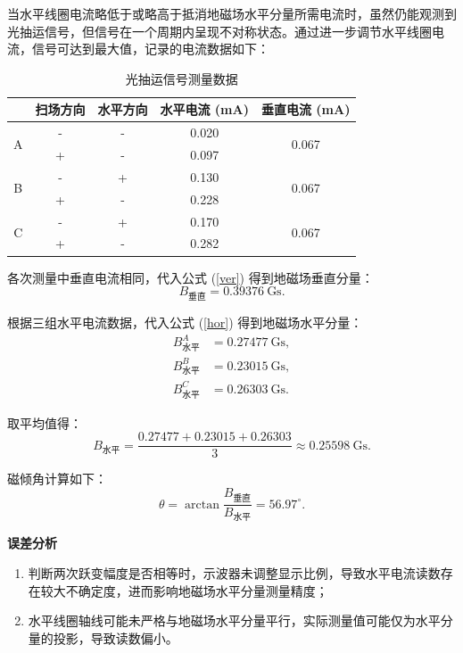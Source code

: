 \documentclass[a4paper, 1.5lines]{ctexart}
\begin{document}
当水平线圈电流略低于或略高于抵消地磁场水平分量所需电流时，虽然仍能观测到光抽运信号，但信号在一个周期内呈现不对称状态。通过进一步调节水平线圈电流，信号可达到最大值，记录的电流数据如下：

\begin{table}[h!]
    \centering
    \caption{光抽运信号测量数据}
    \label{tab:optical_data}
    \begin{tabular}{|c|c|c|c|c|}
    \hline
         & 扫场方向 & 水平方向 & 水平电流 (mA) & 垂直电流 (mA) \\
    \hline
    \multirow{2}{*}{A} & - & - & 0.020 & \multirow{2}{*}{0.067} \\
    \cline{2-4}
         & + & - & 0.097 &  \\
    \hline
    \multirow{2}{*}{B} & - & + & 0.130 & \multirow{2}{*}{0.067} \\
    \cline{2-4}
         & + & - & 0.228 &  \\
    \hline
    \multirow{2}{*}{C} & - & + & 0.170 & \multirow{2}{*}{0.067} \\
    \cline{2-4}
         & + & - & 0.282 &  \\
    \hline
    \end{tabular}
\end{table}

各次测量中垂直电流相同，代入公式 (\ref{ver}) 得到地磁场垂直分量：
\[
B_{\text{垂直}} = 0.39376\ \text{Gs}.
\]

根据三组水平电流数据，代入公式 (\ref{hor}) 得到地磁场水平分量：
\[
\begin{aligned}
B_{\text{水平}}^A &= 0.27477\ \text{Gs},\\
B_{\text{水平}}^B &= 0.23015\ \text{Gs},\\
B_{\text{水平}}^C &= 0.26303\ \text{Gs}.
\end{aligned}
\]

取平均值得：
\[
B_{\text{水平}} = \frac{0.27477 + 0.23015 + 0.26303}{3} \approx 0.25598\ \text{Gs}.
\]

磁倾角计算如下：
\[
\theta = \arctan\frac{B_{\text{垂直}}}{B_{\text{水平}}} = 56.97^\circ.
\]

\textbf{误差分析}
\begin{enumerate}
    \item 判断两次跃变幅度是否相等时，示波器未调整显示比例，导致水平电流读数存在较大不确定度，进而影响地磁场水平分量测量精度；
    \item 水平线圈轴线可能未严格与地磁场水平分量平行，实际测量值可能仅为水平分量的投影，导致读数偏小。
\end{enumerate}
\end{document}
